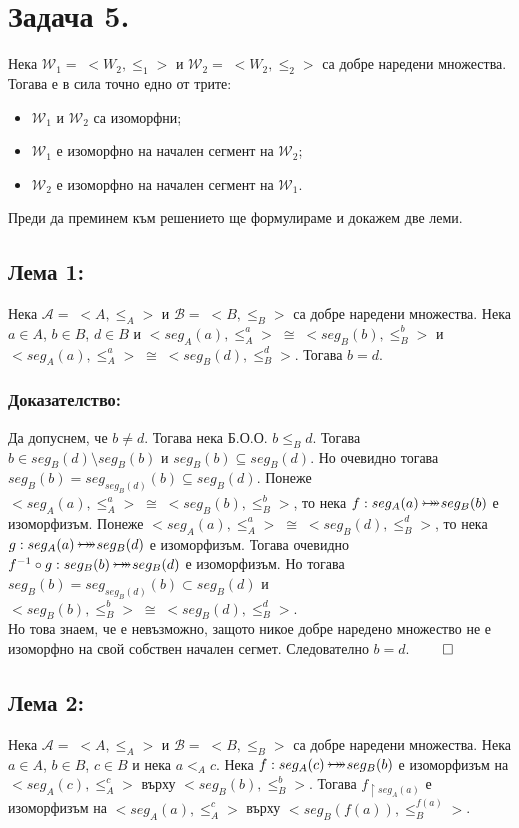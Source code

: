\documentclass[12pt]{article}
\newcommand{\bijection}[0]{\mathbin{\mathlarger{\mathlarger{\rightarrowtail}} \hspace{-14pt} \mathlarger{\mathlarger{\twoheadrightarrow}}}}
\begin{document}
\section*{Задача 5.}
Нека \(\mathcal{W}_1 = \; <W_2, \leq_1>\) и \(\mathcal{W}_2 = \; <W_2, \leq_2>\) са добре наредени множества.
Тогава е в сила точно едно от трите:
\begin{itemize}
    \item \(\mathcal{W}_1\) и \(\mathcal{W}_2\) са изоморфни;
    \item \(\mathcal{W}_1\) е изоморфно на начален сегмент на \(\mathcal{W}_2\);
    \item \(\mathcal{W}_2\) е изоморфно на начален сегмент на \(\mathcal{W}_1\).
\end{itemize}
\vspace{1mm}
Преди да преминем към решението ще формулираме и докажем две леми.
\subsection*{Лема 1:}
Нека \(\mathcal{A} = \; <A, \leq_A>\) и \(\mathcal{B} = \; <B, \leq_B>\) са добре наредени множества.
Нека \(a \in A\), \(b \in B\), \(d \in B\) и
\(<seg_A(a), \leq_A^a> \; \cong \; <seg_B(b), \leq_B^b>\)
и \(<seg_A(a), \leq_A^a> \; \cong \; <seg_B(d), \leq_B^d>\).
Тогава \(b = d\).
\subsubsection*{Доказателство:}
Да допуснем, че \(b \neq d\).
Тогава нека Б.О.О. \(b \leq_B d\).
Тогава
\\
\(b \in seg_B(d) \setminus seg_B(b)\) и \(seg_B(b) \subseteq seg_B(d)\).
Но очевидно тогава \(seg_B(b) = seg_{seg_B(d)}(b) \subseteq seg_B(d)\).
Понеже
\(<seg_A(a), \leq_A^a> \; \cong \; <seg_B(b), \leq_B^b>\), то
нека \(f : seg_A(a) \bijection seg_B(b)\) е изоморфизъм.
Понеже \(<seg_A(a), \leq_A^a> \; \cong \; <seg_B(d), \leq_B^d>\),
то нека
\(g : seg_A(a) \bijection seg_B(d)\) е изоморфизъм.
Тогава очевидно
\(f^{-1} \circ g : seg_B(b) \bijection seg_B(d)\)
е изоморфизъм. Но тогава
\\
\(seg_B(b) = seg_{seg_B(d)}(b) \subset seg_B(d)\)
и \(<seg_B(b), \leq_B^b> \; \cong \; <seg_B(d), \leq_B^d>\).
\\
Но това знаем, че е невъзможно, защото никое добре наредено множество
не е изоморфно на свой собствен начален сегмет.
Следователно \(b = d\). \(\qed\)
\subsection*{Лема 2:}
Нека \(\mathcal{A} = \; <A, \leq_A>\) и \(\mathcal{B} = \; <B, \leq_B>\) са добре наредени множества.
Нека \(a \in A\), \(b \in B\), \(c \in B\) и нека \(a <_A c\).
Нека \(f : seg_A(c) \bijection seg_B(b)\) е изоморфизъм на
\(<seg_A(c), \leq_A^c>\) върху \(<seg_B(b), \leq_B^b>\).
Тогава \(f_{\restriction seg_A(a)}\) е изоморфизъм на
\(<seg_A(a), \leq_A^c>\) върху \(<seg_B(f(a)), \leq_B^{f(a)}>\).
\end{document}
